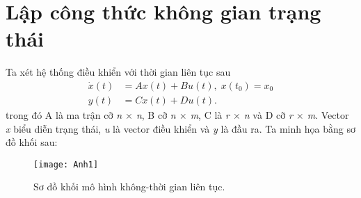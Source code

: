 \section{Lập công thức không gian trạng thái}
Ta xét hệ thống điều khiển với thời gian liên tục sau
\begin{align}
    \dot{x}(t) &= Ax(t) + Bu(t), \; x(t_0) = x_0 \label{ct2.1.1} \\ 
    y(t) &= Cx(t) + Du(t).\nonumber 
\end{align}
trong đó A là ma trận cỡ \emph{n $\times$ n}, B cỡ \emph{n $\times$ m}, C là \emph{r $\times$ n} và D cỡ \emph{r $\times$ m}. Vector \emph{x} biểu diễn trạng thái, \emph{u} là vector điều khiển và \emph{y} là đầu ra. Ta minh họa bằng sơ đồ khối sau:
\begin{figure}[htp]
\centering
  \texttt{[image: Anh1]}
  \caption{Sơ đồ khối mô hình không-thời gian liên tục.}
  \label{fig:pic1}
\end{figure}
